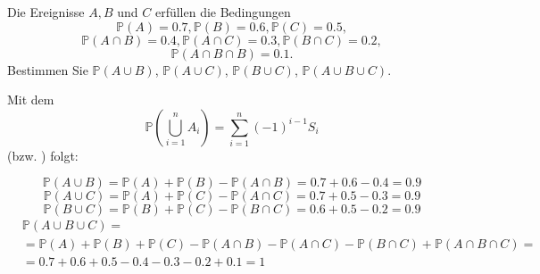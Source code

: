 \begin{uebsp}
\begin{Exercise}[label=ex:1.1]
Die Ereignisse $A,B$ und $C$ erfüllen die Bedingungen
\[\mathbb{P}(A)=0.7,\mathbb{P}(B)=0.6,\mathbb{P}(C)=0.5,\]
\[\mathbb{P}(A\cap B)=0.4,\mathbb{P}(A\cap C)=0.3,\mathbb{P}(B\cap C)=0.2,\]
\[\mathbb{P}(A\cap B\cap B)=0.1.\]
Bestimmen Sie $\mathbb{P}(A\cup B)$, $\mathbb{P}(A\cup C)$, $\mathbb{P}(B\cup C)$, $\mathbb{P}(A\cup B\cup C)$.

\end{Exercise}
\begin{Answer}
\begin{uebsp_theory}
    Mit dem   
    \[\mathbb P(\bigcup_{i=1}^n A_i)=\sum_{i=1}^n(-1)^{i-1}S_i\]
    (bzw. )
    folgt:
\end{uebsp_theory}

\[\mathbb{P}(A\cup B)=\mathbb{P}(A)+\mathbb{P}(B)-\mathbb{P}(A\cap B)=0.7+0.6-0.4=0.9\]
\[\mathbb{P}(A\cup C)=\mathbb{P}(A)+\mathbb{P}(C)-\mathbb{P}(A\cap C)=0.7+0.5-0.3=0.9\]
\[\mathbb{P}(B\cup C)=\mathbb{P}(B)+\mathbb{P}(C)-\mathbb{P}(B\cap C)=0.6+0.5-0.2=0.9\]
\begin{align*}&\mathbb{P}(A\cup B\cup C)= \\
    &=\mathbb{P}(A)+\mathbb{P}(B)+\mathbb{P}(C)-\mathbb{P}(A\cap B)-\mathbb{P}(A\cap C)-\mathbb{P}(B\cap C)+\mathbb{P}(A\cap B\cap C)= \\
    &=0.7+0.6+0.5-0.4-0.3-0.2+0.1=1
\end{align*}

\end{Answer}
\end{uebsp}
